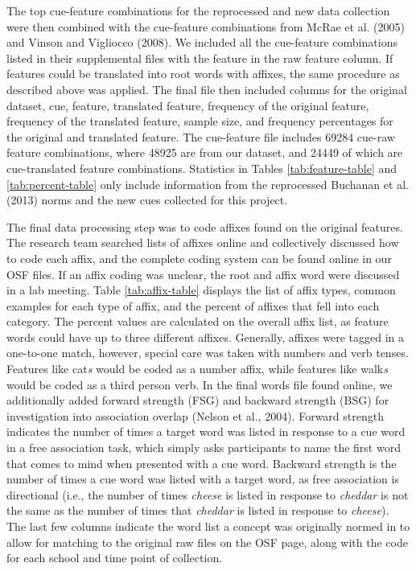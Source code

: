 \documentclass[english,,man]{apa6}
\theoremstyle{definition}
\theoremstyle{definition}
\theoremstyle{definition}
\theoremstyle{remark}
\begin{document}
The top cue-feature combinations for the reprocessed and new data
collection were then combined with the cue-feature combinations from
McRae et al. (2005) and Vinson and Vigliocco (2008). We included all the
cue-feature combinations listed in their supplemental files with the
feature in the raw feature column. If features could be translated into
root words with affixes, the same procedure as described above was
applied. The final file then included columns for the original dataset,
cue, feature, translated feature, frequency of the original feature,
frequency of the translated feature, sample size, and frequency
percentages for the original and translated feature. The cue-feature
file includes 69284 cue-raw feature combinations, where 48925 are from
our dataset, and 24449 of which are cue-translated feature combinations.
Statistics in Tables \ref{tab:feature-table} and \ref{tab:percent-table}
only include information from the reprocessed Buchanan et al. (2013)
norms and the new cues collected for this project.

The final data processing step was to code affixes found on the original
features. The research team searched lists of affixes online and
collectively discussed how to code each affix, and the complete coding
system can be found online in our OSF files. If an affix coding was
unclear, the root and affix word were discussed in a lab meeting. Table
\ref{tab:affix-table} displays the list of affix types, common examples
for each type of affix, and the percent of affixes that fell into each
category. The percent values are calculated on the overall affix list,
as feature words could have up to three different affixes. Generally,
affixes were tagged in a one-to-one match, however, special care was
taken with numbers and verb tenses. Features like cat\emph{s} would be
coded as a number affix, while features like walk\emph{s} would be coded
as a third person verb. In the final words file found online, we
additionally added forward strength (FSG) and backward strength (BSG)
for investigation into association overlap (Nelson et al., 2004).
Forward strength indicates the number of times a target word was listed
in response to a cue word in a free association task, which simply asks
participants to name the first word that comes to mind when presented
with a cue word. Backward strength is the number of times a cue word was
listed with a target word, as free association is directional (i.e., the
number of times \emph{cheese} is listed in response to \emph{cheddar} is
not the same as the number of times that \emph{cheddar} is listed in
response to \emph{cheese}). The last few columns indicate the word list
a concept was originally normed in to allow for matching to the original
raw files on the OSF page, along with the code for each school and time
point of collection.
\end{document}
